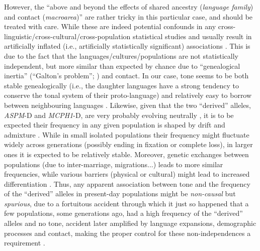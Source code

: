 \documentclass[twoside,onecolumn]{article}
\begin{document}
However, the ``above and beyond the effects of shared ancestry (\textit{language family}) and contact (\textit{macroarea})'' are rather tricky in this particular case, and should be treated with care.
While these are indeed potential confounds in any cross-linguistic/cross-cultural/cross-population statistical studies and usually result in artificially inflated (i.e., artificially statistically significant) associations \citep{ladd_correlational_2015}.
This is due to the fact that the languages/cultures/populations are not statistically independent, but more similar than expected by chance due to ``genealogical inertia'' (``Galton's problem''; \citealp{mace_galtonproblem_1994}) and contact.
In our case, tone seems to be both stable genealogically (i.e., the daughter languages have a strong tendency to conserve the tonal system of their proto-language) and relatively easy to borrow between neighbouring languages \citep{yip_tone_2002,dediu_procb_2011,dediu_cysouw_2013,kauhanen_geospatial_2018,collins_tone_2016}.
Likewise, given that the two ``derived'' alleles, \textit{ASPM}-D and \textit{MCPH1}-D, are very probably evolving neutrally \citep{currat_comment_2006}, it is to be expected their frequency in any given population is shaped by drift and admixture \citep{jobling_human_2013}.
While in small isolated populations their frequency might fluctuate widely across generations (possibly ending in fixation or complete loss), in larger ones it is expected to be relatively stable.
Moreover, genetic exchanges between populations (due to inter-marriage, migrations...) leads to more similar frequencies, while various barriers (physical or cultural) might lead to increased differentiation \citep{jobling_human_2013,reich_who_2018}.
Thus, any apparent association between tone and the frequency of the ``derived'' alleles in present-day populations might be \emph{non-causal} but \emph{spurious}, due to a fortuitous accident through which it just so happened that a few populations, some generations ago, had a high frequency of the ``derived'' alleles and no tone, accident later amplified by language expansions, demographic processes and contact, making the proper control for these non-independences a requirement \citep{roberts_traffic_2013,ladd_correlational_2015}.
\end{document}
